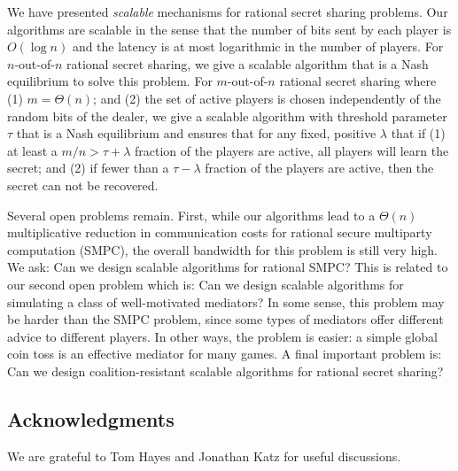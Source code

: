 \documentclass[12pt]{article}
\theoremstyle{definition}
\begin{document}
We have presented \emph{scalable} mechanisms for rational secret sharing problems.  Our algorithms are scalable in the sense that the number of bits sent by each player is $O(\log n)$ and the latency is at most logarithmic in the number of players.  For $n$-out-of-$n$ rational secret sharing, we give a scalable algorithm that is a Nash equilibrium to solve this problem.  For $m$-out-of-$n$ rational secret sharing where (1) $m = \Theta(n)$; and (2) the set of active players is chosen independently of the random bits of the dealer, we give a scalable algorithm with threshold parameter $\tau$ that is a Nash equilibrium and ensures that for any fixed, positive $\lambda$ that if (1) at least a $m/n > \tau + \lambda$ fraction of the players are active, all players will learn the secret; and (2) if fewer than a $\tau -\lambda$ fraction of the players are active, then the secret can not be recovered. 

Several open problems remain.  First, while our algorithms lead to a $\Theta(n)$ multiplicative reduction in communication costs for rational secure multiparty computation (SMPC), the overall bandwidth for this problem is still very high. We ask: Can we design scalable algorithms for rational SMPC?    This is related to our second open problem which is: Can we design scalable algorithms for simulating a class of well-motivated mediators?  In some sense, this problem may be harder than the SMPC problem, since some types of mediators offer different advice to different players.  In other ways, the problem is easier: a simple global coin toss is an effective mediator for many games.  A final important problem is: Can we design coalition-resistant scalable algorithms for rational secret sharing?

\subsection*{Acknowledgments}

We are grateful to Tom Hayes and Jonathan Katz for useful discussions.







\end{document}
